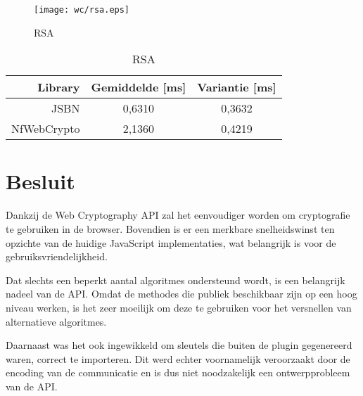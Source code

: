 \begin{figure}
  \centering
  \texttt{[image: wc/rsa.eps]}
  \caption{RSA}
  \label{fig:wc:rsa}
\end{figure}

\begin{table}
  \centering
  \caption{RSA}
  \label{tab:wc:rsa}
  \begin{tabular}{r | c c}
    Library & Gemiddelde [ms] & Variantie [ms] \\ \hline
    JSBN & 0,6310 & 0,3632  \\
    NfWebCrypto & 2,1360 & 0,4219
  \end{tabular}
\end{table}

\section{Besluit}

Dankzij de Web Cryptography API zal het eenvoudiger worden om cryptografie te gebruiken in de browser. Bovendien is er een merkbare snelheidswinst ten opzichte van de huidige JavaScript implementaties, wat belangrijk is voor de gebruiksvriendelijkheid. 

\npar Dat slechts een beperkt aantal algoritmes ondersteund wordt, is een belangrijk nadeel van de API. Omdat de methodes die publiek beschikbaar zijn op een hoog niveau werken, is het zeer moeilijk om deze te gebruiken voor het versnellen van alternatieve algoritmes.

\npar Daarnaast was het ook ingewikkeld om sleutels die buiten de plugin gegenereerd waren, correct te importeren. Dit werd echter voornamelijk veroorzaakt door de encoding van de communicatie en is dus niet noodzakelijk een ontwerpprobleem van de API.
